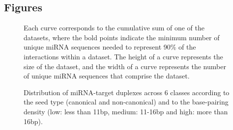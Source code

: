 \documentclass{bmcart}
\def\texttt{[image: ]}
\begin{document}
\begin{backmatter}



\clearpage
\section*{Figures}

\begin{figure}[h!]
  \caption{}
      \label{fig:datasetplot}
      \caption*{Each curve corresponds to the cumulative sum of one of the datasets, where the bold points indicate the minimum number of unique miRNA sequences needed to represent 90\% of the interactions within a dataset. The height of a curve represents the size of the dataset, and the width of a curve represents the number of unique miRNA sequences that comprise the dataset.}
      \end{figure}

\begin{figure}[h!]
  \caption{} 
      \label{fig:seed_type_pos}
      \caption*{Distribution of miRNA-target duplexes across 6 classes according to the seed type (canonical and non-canonical) and to the base-pairing density (low: less than 11bp, medium: 11-16bp and high: more than 16bp).}
      \end{figure}


\end{backmatter}
\end{document}
